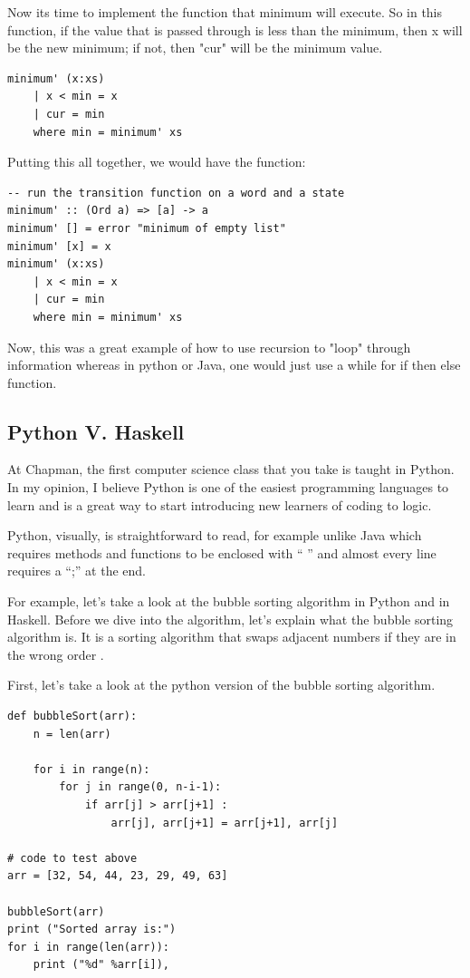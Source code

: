 \documentclass{article}
\begin{document}
\medskip\noindent
Now its time to implement the function that minimum will execute. So in this function, if the value that is passed through is less than the minimum, then x will be the new minimum; if not, then "cur" will be the minimum value. 

\medskip\noindent
\begin{lstlisting}
minimum' (x:xs)   
    | x < min = x  
    | cur = min  
    where min = minimum' xs
\end{lstlisting}

\medskip\noindent
Putting this all together, we would have the function: \cite{MF}

\medskip\noindent
\begin{lstlisting}
-- run the transition function on a word and a state
minimum' :: (Ord a) => [a] -> a  
minimum' [] = error "minimum of empty list"  
minimum' [x] = x  
minimum' (x:xs)   
    | x < min = x  
    | cur = min
    where min = minimum' xs
\end{lstlisting}

\medskip\noindent
Now, this was a great example of how to use recursion to "loop" through information whereas in python or Java, one would just use a while for if then else function.

\subsection{Python V. Haskell}

At Chapman, the first computer science class that you take is taught in Python. In my opinion, I believe Python is one of the easiest programming languages to learn and is a great way to start introducing new learners of coding to logic. 

\medskip\noindent
Python, visually, is straightforward to read, for example unlike Java which requires methods and functions to be enclosed with “{ }” and almost every line requires a “;” at the end.

\medskip\noindent
For example, let’s take a look at the bubble sorting algorithm in Python and in Haskell. Before we dive into the algorithm, let’s explain what the bubble sorting algorithm is. It is a sorting algorithm that swaps adjacent numbers if they are in the wrong order \cite{BSS}. 

\medskip\noindent
First, let’s take a look at the python version of the bubble sorting algorithm.

\medskip\noindent
\begin{lstlisting}
def bubbleSort(arr):
    n = len(arr)
 
    for i in range(n):
        for j in range(0, n-i-1):
            if arr[j] > arr[j+1] :
                arr[j], arr[j+1] = arr[j+1], arr[j]
 
# code to test above
arr = [32, 54, 44, 23, 29, 49, 63]
 
bubbleSort(arr)
print ("Sorted array is:")
for i in range(len(arr)):
    print ("%d" %arr[i]), 
\end{lstlisting}
\cite{BSP}
\end{document}
